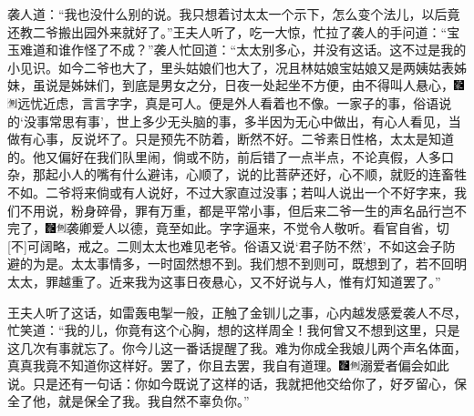 袭人道：“我也没什么别的说。我只想着讨太太一个示下，怎么变个法儿，以后竟还教二爷搬出园外来就好了。”王夫人听了，吃一大惊，忙拉了袭人的手问道：“宝玉难道和谁作怪了不成？”袭人忙回道：“太太别多心，并没有这话。这不过是我的小见识。如今二爷也大了，里头姑娘们也大了，况且林姑娘宝姑娘又是两姨姑表姊妹，虽说是姊妹们，到底是男女之分，日夜一处起坐不方便，由不得叫人悬心，{\includegraphics[width=3mm]{../Images/00006}\includegraphics[width=3mm]{../Images/00011}\footnotesize \kaishu 远忧近虑，言言字字，真是可人。}便是外人看着也不像。一家子的事，俗语说的‘没事常思有事’，世上多少无头脑的事，多半因为无心中做出，有心人看见，当做有心事，反说坏了。只是预先不防着，断然不好。二爷素日性格，太太是知道的。他又偏好在我们队里闹，倘或不防，前后错了一点半点，不论真假，人多口杂，那起小人的嘴有什么避讳，心顺了，说的比菩萨还好，心不顺，就贬的连畜牲不如。二爷将来倘或有人说好，不过大家直过没事；若叫人说出一个不好字来，我们不用说，粉身碎骨，罪有万重，都是平常小事，但后来二爷一生的声名品行岂不完了，{\includegraphics[width=3mm]{../Images/00006}\includegraphics[width=3mm]{../Images/00011}\footnotesize \kaishu 袭卿爱人以德，竟至如此。字字逼来，不觉令人敬听。看官自省，切{[}不{]}可阔略，戒之。}二则太太也难见老爷。俗语又说‘君子防不然’，不如这会子防避的为是。太太事情多，一时固然想不到。我们想不到则可，既想到了，若不回明太太，罪越重了。近来我为这事日夜悬心，又不好说与人，惟有灯知道罢了。”

王夫人听了这话，如雷轰电掣一般，正触了金钏儿之事，心内越发感爱袭人不尽，忙笑道：“我的儿，你竟有这个心胸，想的这样周全！我何曾又不想到这里，只是这几次有事就忘了。你今儿这一番话提醒了我。难为你成全我娘儿两个声名体面，真真我竟不知道你这样好。罢了，你且去罢，我自有道理。{\includegraphics[width=3mm]{../Images/00006}\includegraphics[width=3mm]{../Images/00011}\footnotesize \kaishu 溺爱者偏会如此说。}只是还有一句话：你如今既说了这样的话，我就把他交给你了，好歹留心，保全了他，就是保全了我。我自然不辜负你。”

